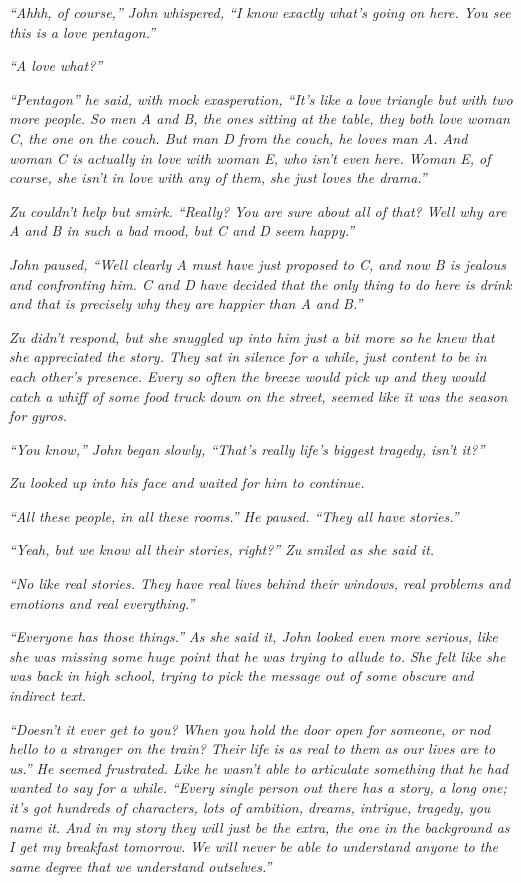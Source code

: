 \textit{	“Ahhh, of course,” John whispered, “I know exactly what’s going on here. You see this is a love pentagon.”}
	
\textit{	“A love what?”}
	
\textit{	“Pentagon” he said, with mock exasperation, “It’s like a love triangle but with two more people. So men A and B, the ones sitting at the table, they both love woman C, the one on the couch. But man D from the couch, he loves man A. And woman C is actually in love with woman E, who isn’t even here. Woman E, of course, she isn’t in love with any of them, she just loves the drama.”}
	
\textit{	Zu couldn’t help but smirk. “Really? You are sure about all of that? Well why are A and B in such a bad mood, but C and D seem happy.”}
	
\textit{	John paused, “Well clearly A must have just proposed to C, and now B is jealous and confronting him. C and D have decided that the only thing to do here is drink and that is precisely why they are happier than A and B.”}
	
\textit{	Zu didn’t respond, but she snuggled up into him just a bit more so he knew that she appreciated the story. They sat in silence for a while, just content to be in each other’s presence. Every so often the breeze would pick up and they would catch a whiff of some food truck down on the street, seemed like it was the season for gyros.}
	
\textit{	“You know,” John began slowly, “That’s really life’s biggest tragedy, isn’t it?”}
	
\textit{	Zu looked up into his face and waited for him to continue.
}
	
\textit{	“All these people, in all these rooms.” He paused. “They all have stories.”}
	
\textit{	“Yeah, but we know all their stories, right?” Zu smiled as she said it.}
	
\textit{	“No like real stories. They have real lives behind their windows, real problems and emotions and real everything.”}
	
\textit{	“Everyone has those things.” As she said it, John looked even more serious, like she was missing some huge point that he was trying to allude to. She felt like she was back in high school, trying to pick the message out of some obscure and indirect text.}
	
\textit{	“Doesn’t it ever get to you? When you hold the door open for someone, or nod hello to a stranger on the train? Their life is as real to them as our lives are to us.” He seemed frustrated. Like he wasn’t able to articulate something that he had wanted to say for a while. “Every single person out there has a story, a long one; it’s got hundreds of characters, lots of ambition, dreams, intrigue, tragedy, you name it. And in my story they will just be the extra, the one in the background as I get my breakfast tomorrow. We will never be able to understand anyone to the same degree that we understand outselves.”}
	
